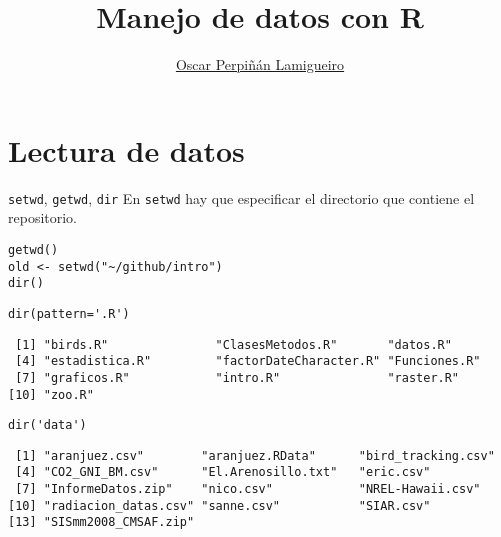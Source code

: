 \documentclass[aspectratio=169, usenames,svgnames,dvipsnames]{beamer}
\author{\href{https://oscarperpinan.github.io}{Oscar Perpiñán Lamigueiro}}
\date{}
\title{Manejo de datos con R}
\institute[UPM]{Universidad Politécnica de Madrid}
\begin{document}
\maketitle

\section{Lectura de datos}
\label{sec:org4f3c9b7}
\begin{frame}[label={sec:org67cb4d3},fragile]{\texttt{setwd}, \texttt{getwd}, \texttt{dir}}
 En \texttt{setwd} hay que especificar el directorio que contiene el repositorio.
\lstset{language=r,label= ,caption= ,captionpos=b,numbers=none}
\begin{lstlisting}
getwd()
old <- setwd("~/github/intro")
dir()
\end{lstlisting}

\lstset{language=r,label= ,caption= ,captionpos=b,numbers=none}
\begin{lstlisting}
dir(pattern='.R')
\end{lstlisting}

\begin{verbatim}
 [1] "birds.R"               "ClasesMetodos.R"       "datos.R"              
 [4] "estadistica.R"         "factorDateCharacter.R" "Funciones.R"          
 [7] "graficos.R"            "intro.R"               "raster.R"             
[10] "zoo.R"
\end{verbatim}


\lstset{language=r,label= ,caption= ,captionpos=b,numbers=none}
\begin{lstlisting}
dir('data')
\end{lstlisting}

\begin{verbatim}
 [1] "aranjuez.csv"        "aranjuez.RData"      "bird_tracking.csv"  
 [4] "CO2_GNI_BM.csv"      "El.Arenosillo.txt"   "eric.csv"           
 [7] "InformeDatos.zip"    "nico.csv"            "NREL-Hawaii.csv"    
[10] "radiacion_datas.csv" "sanne.csv"           "SIAR.csv"           
[13] "SISmm2008_CMSAF.zip"
\end{verbatim}
\end{frame}
\end{document}
